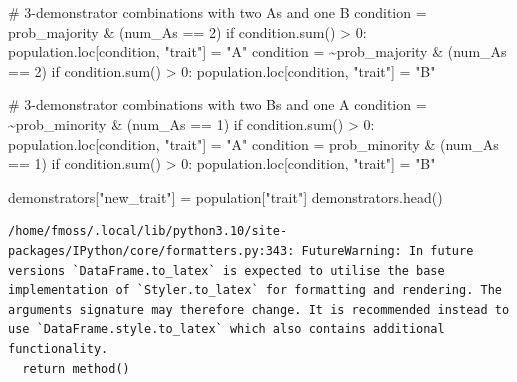 \documentclass[
  a4paperpaper,
  ,captions=tableheading
]{scrbook}
\newenvironment{Shaded}{\begin{snugshade}}{\end{snugshade}}
\newcommand{\BuiltInTok}[1]{\textcolor[rgb]{0.00,0.23,0.31}{#1}}
\newcommand{\CommentTok}[1]{\textcolor[rgb]{0.37,0.37,0.37}{#1}}
\newcommand{\ControlFlowTok}[1]{\textcolor[rgb]{0.00,0.23,0.31}{#1}}
\newcommand{\DecValTok}[1]{\textcolor[rgb]{0.68,0.00,0.00}{#1}}
\newcommand{\NormalTok}[1]{\textcolor[rgb]{0.00,0.23,0.31}{#1}}
\newcommand{\OperatorTok}[1]{\textcolor[rgb]{0.37,0.37,0.37}{#1}}
\newcommand{\StringTok}[1]{\textcolor[rgb]{0.13,0.47,0.30}{#1}}
\begin{document}
\begin{Shaded}
\begin{Highlighting}[]
\CommentTok{\# 3{-}demonstrator combinations with two As and one B}
\NormalTok{condition }\OperatorTok{=}\NormalTok{ prob\_majority }\OperatorTok{\&}\NormalTok{ (num\_As }\OperatorTok{==} \DecValTok{2}\NormalTok{)}
\ControlFlowTok{if}\NormalTok{ condition.}\BuiltInTok{sum}\NormalTok{() }\OperatorTok{\textgreater{}} \DecValTok{0}\NormalTok{:}
\NormalTok{    population.loc[condition, }\StringTok{"trait"}\NormalTok{] }\OperatorTok{=} \StringTok{"A"}
\NormalTok{condition }\OperatorTok{=} \OperatorTok{\textasciitilde{}}\NormalTok{prob\_majority }\OperatorTok{\&}\NormalTok{ (num\_As }\OperatorTok{==} \DecValTok{2}\NormalTok{)}
\ControlFlowTok{if}\NormalTok{ condition.}\BuiltInTok{sum}\NormalTok{() }\OperatorTok{\textgreater{}} \DecValTok{0}\NormalTok{:}
\NormalTok{    population.loc[condition, }\StringTok{"trait"}\NormalTok{] }\OperatorTok{=} \StringTok{"B"}

\CommentTok{\# 3{-}demonstrator combinations with two B\textquotesingle{}s and one A}
\NormalTok{condition }\OperatorTok{=} \OperatorTok{\textasciitilde{}}\NormalTok{prob\_minority }\OperatorTok{\&}\NormalTok{ (num\_As }\OperatorTok{==} \DecValTok{1}\NormalTok{)}
\ControlFlowTok{if}\NormalTok{ condition.}\BuiltInTok{sum}\NormalTok{() }\OperatorTok{\textgreater{}} \DecValTok{0}\NormalTok{:}
\NormalTok{    population.loc[condition, }\StringTok{"trait"}\NormalTok{] }\OperatorTok{=} \StringTok{"A"}
\NormalTok{condition }\OperatorTok{=}\NormalTok{ prob\_minority }\OperatorTok{\&}\NormalTok{ (num\_As }\OperatorTok{==} \DecValTok{1}\NormalTok{)}
\ControlFlowTok{if}\NormalTok{ condition.}\BuiltInTok{sum}\NormalTok{() }\OperatorTok{\textgreater{}} \DecValTok{0}\NormalTok{:}
\NormalTok{    population.loc[condition, }\StringTok{"trait"}\NormalTok{] }\OperatorTok{=} \StringTok{"B"}
\end{Highlighting}
\end{Shaded}

\begin{Shaded}
\begin{Highlighting}[]
\NormalTok{demonstrators[}\StringTok{"new\_trait"}\NormalTok{] }\OperatorTok{=}\NormalTok{ population[}\StringTok{"trait"}\NormalTok{]}
\NormalTok{demonstrators.head()}
\end{Highlighting}
\end{Shaded}

\begin{verbatim}
/home/fmoss/.local/lib/python3.10/site-packages/IPython/core/formatters.py:343: FutureWarning: In future versions `DataFrame.to_latex` is expected to utilise the base implementation of `Styler.to_latex` for formatting and rendering. The arguments signature may therefore change. It is recommended instead to use `DataFrame.style.to_latex` which also contains additional functionality.
  return method()
\end{verbatim}
\end{document}
